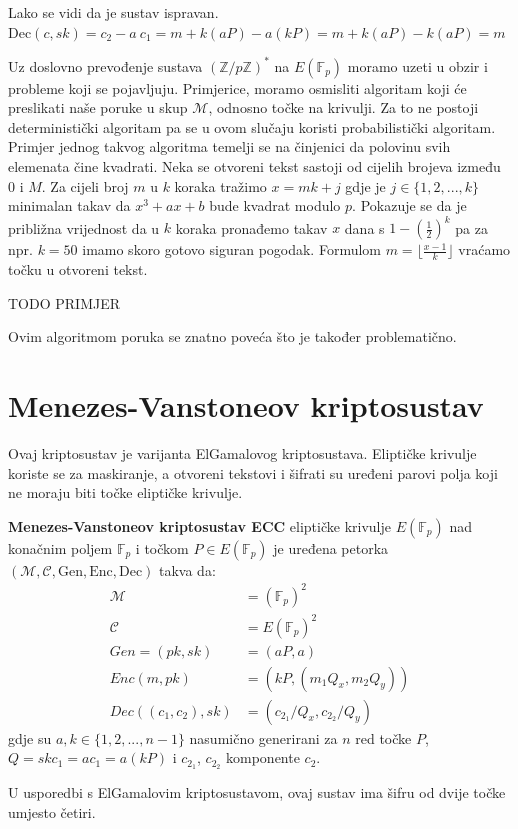 \documentclass{mathos}
\begin{document}
\begin{nap}
    Lako se vidi da je sustav ispravan. $\text{Dec}(c, sk) = c_2 - a \ c_1 = m + k(aP) - a(kP) = m + k(aP) - k(aP) = m$
\end{nap}

Uz doslovno prevođenje sustava $(\mathbb{Z}/p\mathbb{Z})^*$ na $E(\mathbb{F}_p)$ moramo uzeti u obzir i probleme koji se pojavljuju. Primjerice, moramo osmisliti algoritam koji će preslikati naše poruke u skup $\mathcal{M}$, odnosno točke na krivulji. Za to ne postoji deterministički algoritam pa se u ovom slučaju koristi probabilistički algoritam. Primjer jednog takvog algoritma temelji se na činjenici da polovinu svih elemenata čine kvadrati. Neka se otvoreni tekst sastoji od cijelih brojeva između $0$ i $M$. Za cijeli broj $m$ u $k$ koraka tražimo $x = mk + j$ gdje je $j\in\{1, 2, ..., k\}$ minimalan takav da $x^3 + ax + b$ bude kvadrat modulo $p$. Pokazuje se da je približna vrijednost da u $k$ koraka pronađemo takav $x$ dana s $1 - (\frac{1}{2})^k$ pa za npr. $k = 50$ imamo skoro gotovo siguran pogodak. Formulom $m = \lfloor \frac{x-1}{k} \rfloor$ vraćamo točku u otvoreni tekst.

TODO PRIMJER

\begin{nap}
    Ovim algoritmom poruka se znatno poveća što je također problematično.
\end{nap}


\section{Menezes-Vanstoneov kriptosustav}
Ovaj kriptosustav je varijanta ElGamalovog kriptosustava. Eliptičke krivulje koriste se za maskiranje, a otvoreni tekstovi i šifrati su uređeni parovi polja koji ne moraju biti točke eliptičke krivulje.

\begin{defin}
    \textbf{Menezes-Vanstoneov kriptosustav ECC} eliptičke krivulje $E(\mathbb{F}_p)$ nad konačnim poljem $\mathbb{F}_p$ i točkom $P\in E(\mathbb{F}_p)$ je uređena petorka $(\mathcal{M}, \mathcal{C}, \text{Gen}, \text{Enc}, \text{Dec})$ takva da:
    \begin{align*}
        \mathcal{M} & = (\mathbb{F}_p)^2 \\
        \mathcal{C} & = E(\mathbb{F}_p)^2 \\
        Gen = (pk, sk) & = (aP, a) \\
        Enc(m, pk) & = (kP, (m_1 Q_x, m_2 Q_y)) \\
        Dec((c_1, c_2), sk) & = (c_{2_1}/Q_x, c_{2_2}/Q_y)
    \end{align*}
    gdje su $a, k \in \{ 1, 2, ..., n-1 \}$ nasumično generirani za $n$ red točke $P$, $Q = sk c_1 = a c_1 = a(kP)$ i $c_{2_1}$, $c_{2_2}$ komponente $c_2$.
\end{defin}
U usporedbi s ElGamalovim kriptosustavom, ovaj sustav ima šifru od dvije točke umjesto četiri.
\end{document}
